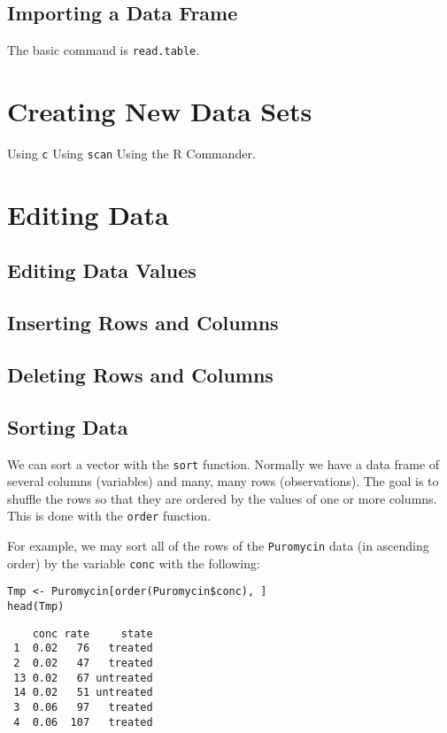\documentclass[captions=tableheading]{scrbook}
\begin{document}
\subsection{Importing a Data Frame}
\label{sec-5-2-4}


The basic command is \texttt{read.table}.
\section{Creating New Data Sets \label{sec:Creating-New-Data}}
\label{sec-5-3}

Using \texttt{c}
Using \texttt{scan}
Using the \textsf{R} Commander.
\section{Editing Data \label{sec:Editing-Data-Sets}}
\label{sec-5-4}
\subsection{Editing Data Values}
\label{sec-5-4-1}
\subsection{Inserting Rows and Columns}
\label{sec-5-4-2}
\subsection{Deleting Rows and Columns}
\label{sec-5-4-3}
\subsection{Sorting Data}
\label{sec-5-4-4}


We can sort a vector with the \texttt{sort} function. Normally we have a data frame of several columns (variables) and many, many rows (observations). The goal is to shuffle the rows so that they are ordered by the values of one or more columns. This is done with the \texttt{order} function. 

For example, we may sort all of the rows of the \texttt{Puromycin} data (in ascending order) by the variable \texttt{conc} with the following: 


\begin{verbatim}
Tmp <- Puromycin[order(Puromycin$conc), ]
head(Tmp)
\end{verbatim}

\begin{verbatim}
    conc rate     state
 1  0.02   76   treated
 2  0.02   47   treated
 13 0.02   67 untreated
 14 0.02   51 untreated
 3  0.06   97   treated
 4  0.06  107   treated
\end{verbatim}
\end{document}
